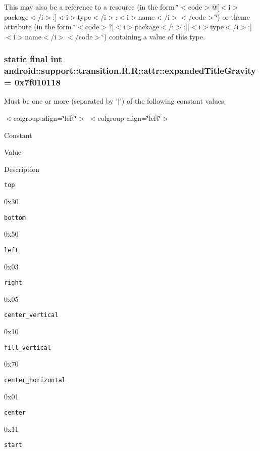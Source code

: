 This may also be a reference to a resource (in the form \char`\"{}$<$code$>$@\mbox{[}$<$i$>$package$<$/i$>$:\mbox{]}$<$i$>$type$<$/i$>$:$<$i$>$name$<$/i$>$$<$/code$>$\char`\"{}) or theme attribute (in the form \char`\"{}$<$code$>$?\mbox{[}$<$i$>$package$<$/i$>$:\mbox{]}\mbox{[}$<$i$>$type$<$/i$>$:\mbox{]}$<$i$>$name$<$/i$>$$<$/code$>$\char`\"{}) containing a value of this type. \hypertarget{classandroid_1_1support_1_1transition_1_1_r_1_1attr_729c6a17e0954df1466c5e76b0f74187}{
\subsubsection[{expandedTitleGravity}]{\setlength{\rightskip}{0pt plus 5cm}static final int android::support::transition.R.R::attr::expandedTitleGravity = 0x7f010118}}
\label{classandroid_1_1support_1_1transition_1_1_r_1_1attr_729c6a17e0954df1466c5e76b0f74187}


Must be one or more (separated by '$|$') of the following constant values. \begin{TabularC}{0}
\hline
\end{TabularC}
$<$colgroup align=\char`\"{}left\char`\"{}$>$ $<$colgroup align=\char`\"{}left\char`\"{}$>$ 

Constant

Value

Description 

{\tt top}

0x30

{\tt bottom}

0x50

{\tt left}

0x03

{\tt right}

0x05

{\tt center\_\-vertical}

0x10

{\tt fill\_\-vertical}

0x70

{\tt center\_\-horizontal}

0x01

{\tt center}

0x11

{\tt start}

